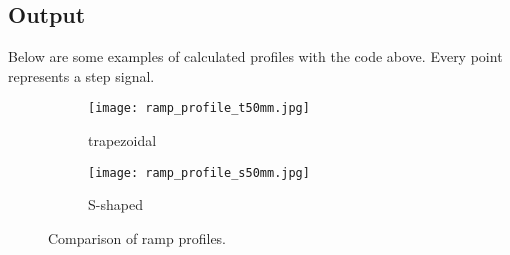 \documentclass[hidelinks, 11pt, fleqn]{article}   	%
\begin{document}
\subsection{Output}
Below are some examples of calculated profiles with the code above. Every point represents a step signal.
\newline
\begin{figure}[h]
	\begin{subfigure}[b]{0.5\linewidth}
		\texttt{[image: ramp\_profile\_t50mm.jpg]}
		\caption{trapezoidal}
		\label{fig:profile1}
	\end{subfigure}
	\begin{subfigure}[b]{0.5\linewidth}
		\texttt{[image: ramp\_profile\_s50mm.jpg]}
		\caption{S-shaped}
		\label{fig:profile2}
	\end{subfigure}
	\caption{Comparison of ramp profiles.}
\end{figure}
%
\end{document}
